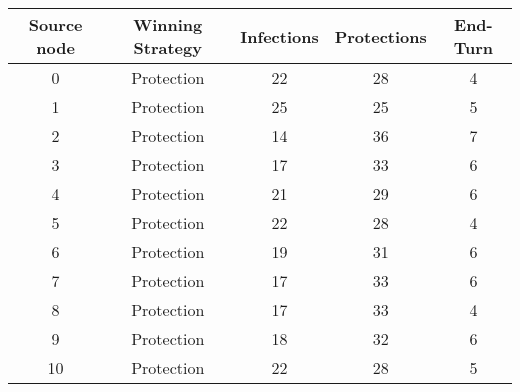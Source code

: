 \documentclass[results.tex]{subfiles}
\begin{document}
    \begin{center}
        \begin{tabular}{| c || c | c | c | c |}
            \hline
            {\bfseries Source node} & {\bfseries Winning Strategy} & {\bfseries Infections} & {\bfseries Protections}
            & {\bfseries End-Turn}
            \\  %
            \hline\hline
            0                       & Protection                   & 22                     & 28                      & 4                    \\
            \hline
            1                       & Protection                   & 25                     & 25                      & 5                    \\
            \hline
            2                       & Protection                   & 14                     & 36                      & 7                    \\
            \hline
            3                       & Protection                   & 17                     & 33                      & 6                    \\
            \hline
            4                       & Protection                   & 21                     & 29                      & 6                    \\
            \hline
            5                       & Protection                   & 22                     & 28                      & 4                    \\
            \hline
            6                       & Protection                   & 19                     & 31                      & 6                    \\
            \hline
            7                       & Protection                   & 17                     & 33                      & 6                    \\
            \hline
            8                       & Protection                   & 17                     & 33                      & 4                    \\
            \hline
            9                       & Protection                   & 18                     & 32                      & 6                    \\
            \hline
            10                      & Protection                   & 22                     & 28                      & 5                    \\

\end{tabular}
\end{center}
\end{document}
